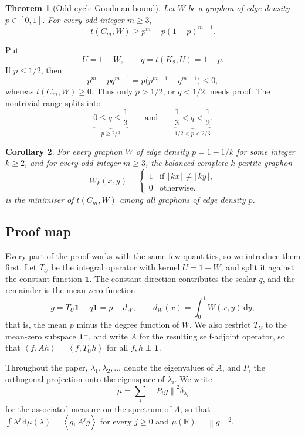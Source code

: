 \documentclass[11pt]{article}
\newtheorem{theorem}{Theorem}[section]
\newtheorem{corollary}[theorem]{Corollary}
\numberwithin{equation}{section}
\newcommand{\one}{\mathbf 1}
\newcommand{\R}{\mathbb R}
\newcommand{\ip}[2]{\left\langle #1,#2\right\rangle}
\newcommand{\norm}[1]{\left\lVert #1\right\rVert}
\newcommand{\dd}{\,\mathrm d}
\begin{document}
\begin{theorem}[Odd-cycle Goodman bound]\label{thm:main}
  Let $W$ be a graphon of edge density $p\in[0,1]$.  For every odd integer
  $m\ge3$,
  \begin{equation}\label{eq:main-goal}
    t(C_m,W)\ge p^m-p(1-p)^{m-1}.
  \end{equation}
\end{theorem}

Put
\[
  U=1-W,\qquad q=t(K_2,U)=1-p.
\]
If $p\le1/2$, then
\[
  p^m-pq^{m-1}=p\bigl(p^{m-1}-q^{m-1}\bigr)\le0,
\]
whereas $t(C_m,W)\ge0$.  Thus only $p>1/2$, or $q<1/2$, needs proof.
The nontrivial range splits into
\[
  \underbrace{0\le q\le\frac{1}{3}}_{p\ge2/3}
  \qquad\text{and}\qquad
  \underbrace{\frac{1}{3}<q<\frac{1}{2}}_{1/2<p<2/3}.
\]

\begin{corollary} \label{cor:main}
  For every graphon $W$ of edge density $p = 1 - 1 / k$ for some integer $k \ge 2$, and for every odd integer $m \ge 3$, the balanced complete $k$-partite graphon 
  \[
    W_k(x, y) = \begin{cases}
      1 & \text{if } \lfloor kx \rfloor \neq \lfloor ky \rfloor,
      \\
      0 & \text{otherwise}.
    \end{cases}
  \]
  is the minimiser of $t(C_m, W)$ among all graphons of edge density $p$.
\end{corollary}

\subsection{Proof map}

Every part of the proof works with the same few quantities, so we introduce
them first.  Let $T_U$ be the integral operator with kernel $U=1-W$, and
split it against the constant function $\one$.  The constant direction
contributes the scalar $q$, and the remainder is the mean-zero function
\[
  g=T_U\one-q\one
  =p-d_W,\qquad d_W(x)=\int_0^1W(x,y)\dd y,
\]
that is, the mean $p$ minus the degree function of $W$.  We also restrict
$T_U$ to the mean-zero subspace $\one^\perp$, and write $A$ for the
resulting self-adjoint operator, so that $\ip f{Ah}=\ip f{T_Uh}$ for all
$f,h\perp\one$.

Throughout the paper, $\lambda_1,\lambda_2,\ldots$ denote the eigenvalues of
$A$, and $P_i$ the orthogonal projection onto the eigenspace of
$\lambda_i$.  We write
\[
  \mu=\sum_i\norm{P_ig}^2\delta_{\lambda_i}
\]
for the associated measure on the spectrum of $A$, so that
$\int\lambda^j\dd\mu(\lambda)=\ip g{A^jg}$ for every $j\ge0$ and
$\mu(\R)=\norm g^2$. 
\end{document}
